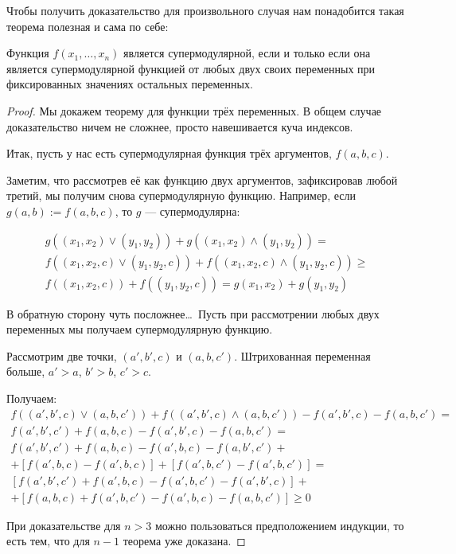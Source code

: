 Чтобы получить доказательство для произвольного случая нам понадобится такая теорема полезная и сама по себе:
\begin{myth}
Функция $ f(x_{1},\ldots,x_{n}) $ является супермодулярной, если и только если она является супермодулярной функцией от любых двух своих переменных при фиксированных значениях остальных переменных.
\end{myth}

\begin{proof}

Мы докажем теорему для функции трёх переменных. В общем случае доказательство ничем не сложнее, просто навешивается куча индексов.

Итак, пусть у нас есть супермодулярная функция трёх аргументов, $ f(a,b,c) $.

Заметим, что рассмотрев её как функцию двух аргументов, зафиксировав любой третий, мы получим снова супермодулярную функцию. Например, если $ g(a,b):=f(a,b,c) $, то $ g $ — супермодулярна:

\begin{multline}
g((x_{1},x_{2})\vee (y_{1},y_{2}))+g((x_{1},x_{2})\wedge (y_{1},y_{2}))=\\
f((x_{1},x_{2},c)\vee (y_{1},y_{2},c))+f((x_{1},x_{2},c)\wedge (y_{1},y_{2},c))\geq \\
f((x_{1},x_{2},c))+f((y_{1},y_{2},c))=g(x_{1},x_{2})+g(y_{1},y_{2})
\end{multline}

В обратную сторону чуть посложнее\ldots~Пусть при рассмотрении любых двух переменных мы получаем супермодулярную функцию.

Рассмотрим две точки, $(a',b',c) $ и $ (a,b,c') $. Штрихованная переменная больше, $ a'>a $, $ b'>b $, $ c'>c $.

Получаем:
\begin{multline}
f((a',b',c)\vee (a,b,c'))+f((a',b',c)\wedge (a,b,c'))-f(a',b',c)-f(a,b,c')=\\
f(a',b',c')+f(a,b,c)-f(a',b',c)-f(a,b,c')=\\
f(a',b',c')+f(a,b,c)-f(a',b,c)-f(a,b',c')+\\
+[f(a',b,c)-f(a',b,c)]+[f(a',b,c')-f(a',b,c')]=\\
[f(a',b',c')+f(a',b,c)-f(a',b,c')-f(a',b',c)]+\\
+[f(a,b,c)+f(a',b,c')-f(a',b,c)-f(a,b,c')]\geq 0
\end{multline}

При доказательстве для $ n>3 $ можно пользоваться предположением индукции, то есть тем, что для $ n-1 $ теорема уже доказана.
\end{proof}

